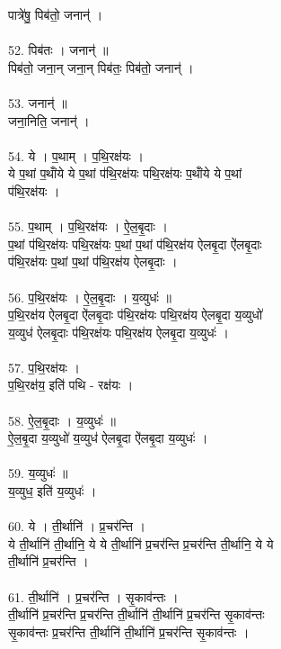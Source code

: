 पात्रे॑षु॒ पिब॑तो॒ जनान्॑ ।\\
\\
52. पिब॑तः । जनान्॑ ॥\\
पिब॑तो॒ जना॒न् जना॒न् पिब॑तः॒ पिब॑तो॒ जनान्॑ ।\\
\\
53. जनान्॑ ॥\\
जना॒निति॒ जनान्॑ ।\\
\\
54. ये । प॒थाम् । प॒थि॒रक्ष॑यः ।\\
ये प॒थां प॒थांँये ये प॒थां प॑थि॒रक्ष॑यः पथि॒रक्ष॑यः प॒थांँये ये प॒थां\\
प॑थि॒रक्ष॑यः ।\\
\\
55. प॒थाम् । प॒थि॒रक्ष॑यः । ऐ॒ल॒बृ॒दाः ।\\
प॒थां प॑थि॒रक्ष॑यः पथि॒रक्ष॑यः प॒थां प॒थां प॑थि॒रक्ष॑य ऐलबृ॒दा ऐ॑लबृ॒दाः\\
प॑थि॒रक्ष॑यः प॒थां प॒थां प॑थि॒रक्ष॑य ऐलबृ॒दाः ।\\
\\
56. प॒थि॒रक्ष॑यः । ऐ॒ल॒बृ॒दाः । य॒व्युधः॑ ॥\\
प॒थि॒रक्ष॑य ऐलबृ॒दा ऐ॑लबृ॒दाः प॑थि॒रक्ष॑यः पथि॒रक्ष॑य ऐलबृ॒दा य॒व्युधो॑\\
य॒व्युध॑ ऐलबृ॒दाः प॑थि॒रक्ष॑यः पथि॒रक्ष॑य ऐलबृ॒दा य॒व्युधः॑ ।\\
\\
57. प॒थि॒रक्ष॑यः ।\\
प॒थि॒रक्ष॑य॒ इति॑ पथि - रक्ष॑यः ।\\
\\
58. ऐ॒ल॒बृ॒दाः । य॒व्युधः॑ ॥\\
ऐ॒ल॒बृ॒दा य॒व्युधो॑ य॒व्युध॑ ऐलबृ॒दा ऐ॑लबृ॒दा य॒व्युधः॑ ।\\
\\
59. य॒व्युधः॑ ॥\\
य॒व्युध॒ इति॑ य॒व्युधः॑ ।\\
\\
60. ये । ती॒र्थानि॑ । प्र॒चर॑न्ति ।\\
ये ती॒र्थानि॑ ती॒र्थानि॒ ये ये ती॒र्थानि॑ प्र॒चर॑न्ति प्र॒चर॑न्ति ती॒र्थानि॒ ये ये\\
ती॒र्थानि॑ प्र॒चर॑न्ति ।\\
\\
61. ती॒र्थानि॑ । प्र॒चर॑न्ति । सृ॒काव॑न्तः ।\\
ती॒र्थानि॑ प्र॒चर॑न्ति प्र॒चर॑न्ति ती॒र्थानि॑ ती॒र्थानि॑ प्र॒चर॑न्ति सृ॒काव॑न्तः\\
सृ॒काव॑न्तः प्र॒चर॑न्ति ती॒र्थानि॑ ती॒र्थानि॑ प्र॒चर॑न्ति सृ॒काव॑न्तः ।\\
